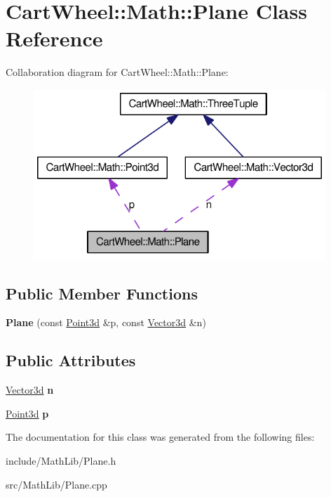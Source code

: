 \hypertarget{classCartWheel_1_1Math_1_1Plane}{
\section{CartWheel::Math::Plane Class Reference}
\label{classCartWheel_1_1Math_1_1Plane}
}


Collaboration diagram for CartWheel::Math::Plane:\nopagebreak
\begin{figure}[H]
\begin{center}
\leavevmode
\includegraphics[width=312pt]{classCartWheel_1_1Math_1_1Plane__coll__graph}
\end{center}
\end{figure}
\subsection*{Public Member Functions}
\begin{DoxyCompactItemize}
\item 
\hypertarget{classCartWheel_1_1Math_1_1Plane_ae6753a38f73227107acd9c417c7f3bde}{
{\bfseries Plane} (const \hyperlink{classCartWheel_1_1Math_1_1Point3d}{Point3d} \&p, const \hyperlink{classCartWheel_1_1Math_1_1Vector3d}{Vector3d} \&n)}
\label{classCartWheel_1_1Math_1_1Plane_ae6753a38f73227107acd9c417c7f3bde}

\end{DoxyCompactItemize}
\subsection*{Public Attributes}
\begin{DoxyCompactItemize}
\item 
\hypertarget{classCartWheel_1_1Math_1_1Plane_ac97c2c24c1b683ade196c853d71a4d8d}{
\hyperlink{classCartWheel_1_1Math_1_1Vector3d}{Vector3d} {\bfseries n}}
\label{classCartWheel_1_1Math_1_1Plane_ac97c2c24c1b683ade196c853d71a4d8d}

\item 
\hypertarget{classCartWheel_1_1Math_1_1Plane_ac2cdf815c22c5de6a021b409c2926d74}{
\hyperlink{classCartWheel_1_1Math_1_1Point3d}{Point3d} {\bfseries p}}
\label{classCartWheel_1_1Math_1_1Plane_ac2cdf815c22c5de6a021b409c2926d74}

\end{DoxyCompactItemize}


The documentation for this class was generated from the following files:\begin{DoxyCompactItemize}
\item 
include/MathLib/Plane.h\item 
src/MathLib/Plane.cpp\end{DoxyCompactItemize}
